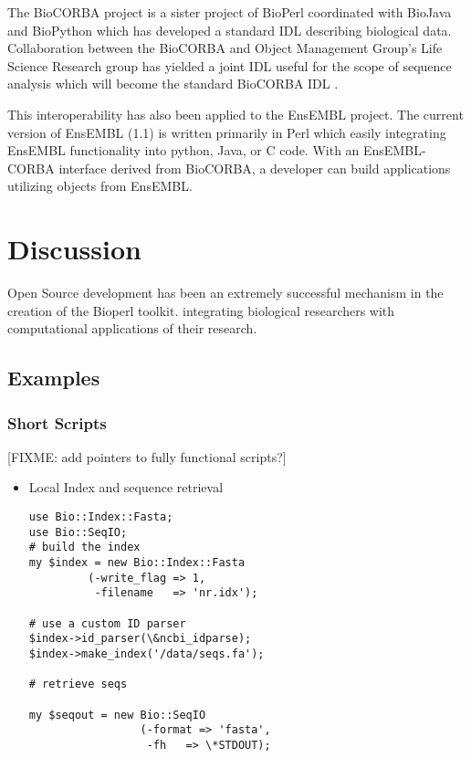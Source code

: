 \documentclass{article}
\begin{document}
\begin{twocolumn}
The BioCORBA project is a sister project of BioPerl coordinated with
BioJava and BioPython which has developed a standard IDL describing
biological data.  Collaboration between the BioCORBA and Object
Management Group's Life Science Research group has yielded a joint IDL
useful for the scope of sequence analysis which will become the
standard BioCORBA IDL \cite{biocorba}.

This interoperability has also been applied to the EnsEMBL project.
The current version of EnsEMBL (1.1) is written primarily in Perl
which easily integrating EnsEMBL functionality into python, Java, or C
code.  With an EnsEMBL-CORBA interface derived from BioCORBA, a
developer can build applications utilizing objects from EnsEMBL.

\section{Discussion}

Open Source development has been an extremely successful mechanism in
the creation of the Bioperl toolkit.  
integrating biological researchers with computational applications of
their research. 

\subsection{Examples}

\subsubsection{Short Scripts}

[FIXME: add pointers to fully functional scripts?]

\begin{itemize}
\item Local Index and sequence retrieval

\begin{scriptsize}
\begin{verbatim}
use Bio::Index::Fasta;
use Bio::SeqIO;
# build the index
my $index = new Bio::Index::Fasta
         (-write_flag => 1,
          -filename   => 'nr.idx');

# use a custom ID parser
$index->id_parser(\&ncbi_idparse); 
$index->make_index('/data/seqs.fa');

# retrieve seqs

my $seqout = new Bio::SeqIO
                 (-format => 'fasta',
                  -fh   => \*STDOUT);


\end{verbatim}
\end{scriptsize}
\end{itemize}
\end{twocolumn}
\end{document}
